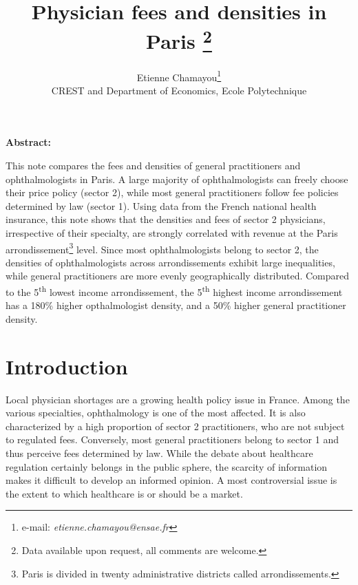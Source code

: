\documentclass[11pt]{article}
\begin{document}
\title{Physician fees and densities in Paris%
\thanks{Data available upon request, all comments are welcome.%
}}

\author{Etienne Chamayou\thanks{e-mail:
\textit{etienne.chamayou@ensae.fr}}\medskip\\{\normalsize CREST and Department of Economics, Ecole Polytechnique }}
\maketitle

\sloppy%

\onehalfspacing

\textbf{Abstract:}

This note compares the fees and densities of general practitioners and ophthalmologists in Paris. A large majority of ophthalmologists can freely choose their price policy (sector 2), while most general practitioners follow fee policies determined by law (sector 1). Using data from the French national health insurance, this note shows that the densities and fees of sector 2 physicians, irrespective of their specialty, are strongly correlated with revenue at the Paris arrondissement\footnote{Paris is divided in twenty administrative districts called arrondissements.} level. Since most ophthalmologists belong to sector 2, the densities of ophthalmologists across arrondissements exhibit large inequalities, while general practitioners are more evenly geographically distributed. Compared to the 5\textsuperscript{th} lowest income arrondissement, the 5\textsuperscript{th} highest income arrondissement has a 180\% higher opthalmologist density, and a 50\% higher general practitioner density.

\strut

\pagebreak%
\doublespacing

\section{Introduction}

Local physician shortages are a growing health policy issue in France. Among the various specialties, ophthalmology is one of the most affected. It is also characterized by a high proportion of sector 2 practitioners, who are not subject to regulated fees. Conversely, most general practitioners belong to sector 1 and thus perceive fees determined by law. While the debate about healthcare regulation certainly belongs in the public sphere, the scarcity of information makes it difficult to develop an informed opinion. A most controversial issue is the extent to which healthcare is or should be a market.
\end{document}
